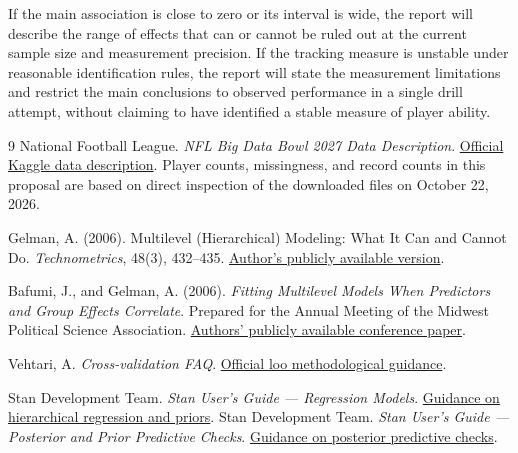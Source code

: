 \documentclass[a4paper,11pt]{article}
\begin{document}
If the main association is close to zero or its interval is wide, the report will describe the range of effects that can or cannot be ruled out at the current sample size and measurement precision. If the tracking measure is unstable under reasonable identification rules, the report will state the measurement limitations and restrict the main conclusions to observed performance in a single drill attempt, without claiming to have identified a stable measure of player ability.

\begin{thebibliography}{9}
National Football League.
\emph{NFL Big Data Bowl 2027 Data Description}.
\href{https://www.kaggle.com/competitions/nfl-big-data-bowl-2027/data}{Official Kaggle data description}.
Player counts, missingness, and record counts in this proposal are based on direct inspection of the downloaded files on October 22, 2026.

Gelman, A. (2006).
Multilevel (Hierarchical) Modeling: What It Can and Cannot Do.
\emph{Technometrics}, 48(3), 432--435.
\href{https://sites.stat.columbia.edu/gelman/research/published/multi2.pdf}{Author's publicly available version}.

Bafumi, J., and Gelman, A. (2006).
\emph{Fitting Multilevel Models When Predictors and Group Effects Correlate}.
Prepared for the Annual Meeting of the Midwest Political Science Association.
\href{https://statmodeling.stat.columbia.edu/wp-content/uploads/2006/04/Bafumi_Gelman_Midwest06.pdf}{Authors' publicly available conference paper}.

Vehtari, A. \emph{Cross-validation FAQ}.
\href{https://mc-stan.org/loo/articles/online-only/faq.html}{Official loo methodological guidance}.

Stan Development Team.
\emph{Stan User's Guide --- Regression Models}.
\href{https://mc-stan.org/docs/stan-users-guide/regression.html}{Guidance on hierarchical regression and priors}.
Stan Development Team.
\emph{Stan User's Guide --- Posterior and Prior Predictive Checks}.
\href{https://mc-stan.org/docs/stan-users-guide/posterior-predictive-checks.html}{Guidance on posterior predictive checks}.
\end{thebibliography}
\end{document}
